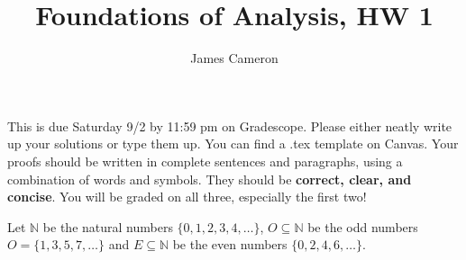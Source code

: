 \documentclass[answers]{exam}
\title{Foundations of Analysis, HW 1}
\author{James Cameron}
\date{}
\newcommand{\NN}{\mathbb{N}}
\begin{document}



 This is due Saturday 9/2 by 11:59 pm on Gradescope. Please either neatly write up your solutions or type them up. You can find a .tex template on Canvas. Your proofs should be written in complete sentences and paragraphs, using a combination of words and symbols. They should be \textbf{correct, clear, and concise}. You will be graded on all three, especially the first two!

\noindent


\begin{questions}

\question Let $\NN$ be the natural numbers $\{0,1,2,3,4,\dots \}$, $O \subseteq \NN$ be the odd numbers $O=\{1,3,5,7,\dots \}$ and $E \subseteq \NN$ be the even numbers $\{0,2,4,6,\dots \}$.
\begin{solution}
\end{solution}
\end{questions}
\end{document}
